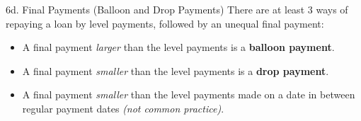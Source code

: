 \begin{CHPT_SUMM_AUTO}[label = {L.-6d}]{6d. Final Payments (Balloon and Drop Payments)}
There are at least 3 ways of repaying a loan by level payments, followed by an unequal final payment:
\begin{itemize}
	\item	A final payment \textit{larger} than the level payments is a \textbf{balloon payment}.
	\item	A final payment \textit{smaller} than the level payments is a \textbf{drop payment}.
	\item	A final payment \textit{smaller} than the level payments made on a date in between regular payment dates \textit{(not common practice)}.
\end{itemize}
\end{CHPT_SUMM_AUTO}
